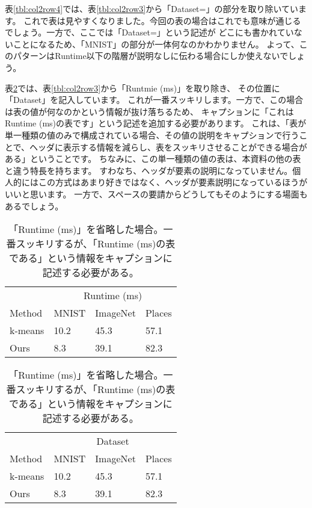 \documentclass[uplatex,onecolumn,9pt,dvipdfmx]{jsarticle}
\newcommand{\Tref}[1]{表\ref{#1}}
\begin{document}
\Tref{tbl:col2row4}では、\Tref{tbl:col2row3}から「Dataset=」の部分を取り除いています。
これで表は見やすくなりました。今回の表の場合はこれでも意味が通じるでしょう。一方で、ここでは「Dataset=」という記述が
どこにも書かれていないことになるため、「MNIST」の部分が一体何なのかわかりません。
よって、このパターンはRuntime以下の階層が説明なしに伝わる場合にしか使えないでしょう。


\Tref{tbl:col2row5}では、\Tref{tbl:col2row3}から「Runtmie (ms)」を取り除き、
その位置に「Dataset」を記入しています。
これが一番スッキリします。一方で、この場合は表の値が何なのかという情報が抜け落ちるため、
キャプションに「これはRuntime (ms)の表です」という記述を追加する必要があります。
これは、「表が単一種類の値のみで構成されている場合、その値の説明をキャプションで行うことで、ヘッダに表示する情報を減らし、表をスッキリさせることができる場合がある」ということです。
ちなみに、この単一種類の値の表は、本資料の他の表と違う特長を持ちます。
すわなち、ヘッダが要素の説明になっていません。個人的にはこの方式はあまり好きではなく、ヘッダが要素説明になっているほうがいいと思います。
一方で、スペースの要請からどうしてもそのようにする場面もあるでしょう。


\begin{table}[h]
    \begin{minipage}{0.48\linewidth}
        \centering
        \begin{tabular}{@{}llll@{}} \toprule
                   & \multicolumn{3}{c}{Runtime (ms)}  \\ \cmidrule(l){2-4}
            Method & MNIST & ImageNet & Places \\ \midrule
            k-means   & 10.2 & 45.3 & 57.1 \\ 
            Ours      & 8.3  & 39.1 & 82.3 \\ \bottomrule   
        \end{tabular}
        \caption{「Dataset=」を省略した場合。見やすくなったが、「Dataset=」の情報はどこにも記述できない。}
        \label{tbl:col2row4}
    \end{minipage}
    \hfill
    \begin{minipage}{0.48\linewidth}
        \centering
        \begin{tabular}{@{}llll@{}} \toprule
                   & \multicolumn{3}{c}{Dataset}  \\ \cmidrule(l){2-4}
            Method & MNIST & ImageNet & Places \\ \midrule
            k-means   & 10.2 & 45.3 & 57.1 \\ 
            Ours      & 8.3  & 39.1 & 82.3 \\ \bottomrule   
        \end{tabular}
        \caption{「Runtime (ms)」を省略した場合。一番スッキリするが、「Runtime (ms)の表である」という情報をキャプションに記述する必要がある。}
        \label{tbl:col2row5}
    \end{minipage}
\end{table}
\end{document}
